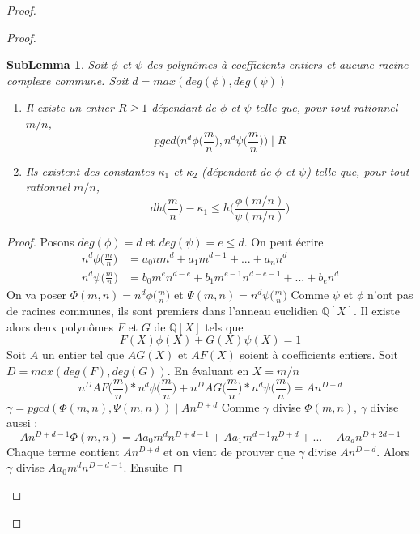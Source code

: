 \documentclass[a4paper]{article}
\newtheorem{slem}{SubLemma}
\begin{document}
\begin{proof}
\begin{proof}
\begin{slem}
Soit $\phi$ et $\psi$ des polynômes à coefficients entiers et aucune racine complexe commune. Soit $d=max(deg(\phi),deg(\psi))$
\begin{enumerate}[label=\roman*)]
\item Il existe un entier $R \geqslant 1$ dépendant de $\phi$ et $\psi$ telle que, pour tout rationnel $m/n$,
\begin{equation*}
pgcd\Big(n^d\phi\Big(\frac{m}{n}\Big),n^d\psi\Big(\frac{m}{n}\Big)\Big) \mid R
\end{equation*}
\item Ils existent des constantes $\kappa_{1}$ et $\kappa_{2}$ (dépendant de $\phi$ et $\psi$) telle que, pour tout rationnel $m/n$,
\begin{equation*}
dh\Big(\frac{m}{n}\Big)-\kappa_{1} \leqslant h\Big(\frac{\phi(m/n)}{\psi(m/n)}\Big) 
\end{equation*}
\end{enumerate}
\end{slem}
\begin{proof}
Posons $deg(\phi)=d$ et $deg(\psi)=e\leqslant d$. On peut écrire
\begin{align*}
n^d\phi\Big(\frac{m}{n}\Big) &= a_{0}nm^d+a_{1}m^{d-1}+...+a_{n}n^d \\
n^d\psi\Big(\frac{m}{n}\Big) &= b_{0}m^en^{d-e}+b_{1}m^{e-1}n^{d-e-1}+...+b_{e}n^d
\end{align*}
On va poser $\Phi(m,n)=n^d\phi\Big(\frac{m}{n}\Big)$ et $\Psi(m,n)=n^d\psi\Big(\frac{m}{n}\Big)$
Comme $\psi$ et $\phi$ n'ont pas de racines communes, ils sont premiers dans l'anneau euclidien $\mathbb{Q}[X]$. Il existe alors deux polynômes $F$ et $G$ de $\mathbb{Q}[X]$ tels que
\begin{equation*}
F(X)\phi(X)+G(X)\psi(X)=1
\end{equation*}
Soit $A$ un entier tel que $AG(X)$ et $AF(X)$ soient à coefficients entiers. Soit $D=max(deg(F),deg(G))$. En évaluant en $X=m/n$ 
\begin{equation*}
n^DAF\Big(\frac{m}{n}\Big) *n^d\phi\Big(\frac{m}{n}\Big)+n^DAG\Big(\frac{m}{n}\Big)*n^d\psi\Big(\frac{m}{n}\Big)=An^{D+d}
\end{equation*}
$\gamma=pgcd(\Phi(m,n),\Psi(m,n)) \mid An^{D+d}$ 
Comme $\gamma$ divise $\Phi(m,n)$, $\gamma$ divise aussi :
\begin{equation*}
An^{D+d-1}\Phi(m,n)=Aa_{0}m^dn^{D+d-1}+Aa_{1}m^{d-1}n^{D+d}+...+Aa_{d}n^{D+2d-1}
\end{equation*}
Chaque terme contient $An^{D+d}$ et on vient de prouver que $\gamma$ divise $An^{D+d}$. Alors $\gamma$ divise $Aa_{0}m^dn^{D+d-1}$. Ensuite

\end{proof}
\end{proof}
\end{proof}
\end{document}
